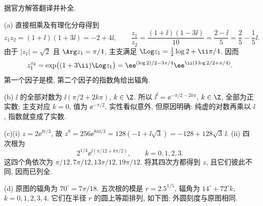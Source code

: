 \begin{solution}
据官方解答翻译并补全.

(a) 直接相乘及有理化分母得到
\[
 z_1z_2=(1+\ii)(1+3\ii)=-2+4\ii,\qquad
 \frac{z_1}{z_2}=\frac{(1+\ii)(1-3\ii)}{10}=\frac{2-\ii}{5}=\frac25-\frac15\ii.
\]
由于 $|z_1|=\sqrt2$ 且 $\Arg z_1=\pi/4$, 主支满足 $\Log z_1=\frac12\log2+\ii\pi/4$. 因而
\[
 z_1^{z_2}=\exp\bigl((1+3\ii)\Log z_1\bigr)
 =\ee^{(\log2)/2-3\pi/4}
   \ee^{\ii(3\log2/2+\pi/4)}.
\]
第一个因子是模, 第二个因子的指数角给出辐角.

(b) $\ii$ 的全部对数为 $\ii(\pi/2+2k\pi)$, $k\in\Z$. 所以
$\ii^\ii=\ee^{-\pi/2-2k\pi}$, $k\in\Z$, 全部为正实数; 主支对应 $k=0$, 值为 $\ee^{-\pi/2}$. 实性看似意外, 但原因明确: 纯虚的对数再乘以 $\ii$, 指数就变成了实数.

(c)(i) $z=2\ee^{\ii\pi/3}$, 故
$z^8=256\ee^{8\pi\ii/3}=128(-1+\ii\sqrt3)=-128+128\sqrt3\,\ii$.
(ii) 四次根为
\[
 2^{1/4}\ee^{\ii(\pi/12+k\pi/2)},\qquad k=0,1,2,3.
\]
这四个角依次为 $\pi/12,7\pi/12,13\pi/12,19\pi/12$. 将其四次方都得到 $z$, 且它们彼此不同, 因而已列全.

(d) 原图的辐角为 $70^\circ=7\pi/18$. 五次根的模是 $r=2.5^{1/5}$, 辐角为
$14^\circ+72^\circ k$, $k=0,1,2,3,4$. 它们在半径 $r$ 的圆上等距排列, 如下图; 外圆刻度与原图相同.
\begin{center}
\end{center}
\end{solution}

